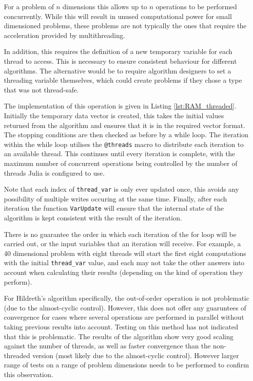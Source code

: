 For a problem of $n$ dimensions this allows up to $n$ operations to be performed concurrently. While this will result in unused computational power for small dimensioned problems, these problems are not typically the ones that require the acceleration provided by multithreading. 

In addition, this requires the definition of a new temporary variable for each thread to access. This is necessary to ensure consistent behaviour for different algorithms. The alternative would be to require algorithm designers to set a threading variable themselves, which could create problems if they chose a type that was not thread-safe.



The implementation of this operation is given in Listing \ref{lst:RAM_threaded}. Initially the temporary data vector is created, this takes the initial values returned from the algorithm and ensures that it is in the required vector format. The stopping conditions are then checked as before by a while loop. The iteration within the while loop utilises the \texttt{@threads} macro to distribute each iteration to an available thread. This continues until every iteration is complete, with the maximum number of concurrent operations being controlled by the number of threads Julia is configured to use.

Note that each index of \texttt{thread\_var} is only ever updated once, this avoids any possibility of multiple writes occuring at the same time. Finally, after each iteration the function \texttt{VarUpdate} will ensure that the internal state of the algorithm is kept consistent with the result of the iteration. 

There is no guarantee the order in which each iteration of the for loop will be carried out, or the input variables that an iteration will receive. For example, a 40 dimensional problem with eight threads will start the first eight computations with the initial \texttt{thread\_var} value, and each may not take the other answers into account when calculating their results (depending on the kind of operation they perform).

For Hildreth's algorithm specifically, the out-of-order operation is not problematic (due to the almost-cyclic control). However, this does not offer any guaruntees of convergence for cases where several operations are performed in parallel without taking previous results into account. Testing on this method has not indicated that this is problematic. The results of the algorithm show very good scaling against the number of threads, as well as faster convergence than the non-threaded version (most likely due to the almost-cyclic control). However larger range of tests on a range of problem dimensions needs to be performed to confirm this observation.

